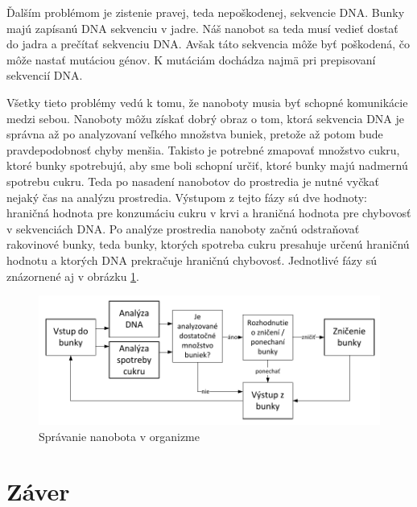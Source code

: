 \documentclass[10pt,twoside,slovak,a4paper]{article}
\begin{document}
Ďalším problémom je zistenie pravej, teda nepoškodenej, sekvencie DNA. Bunky majú zapísanú DNA sekvenciu v jadre. Náš nanobot sa teda musí vedieť dostať do jadra a prečítať sekvenciu DNA. Avšak táto sekvencia môže byť poškodená, čo môže nastať mutáciou génov. K mutáciám dochádza najmä pri prepisovaní sekvencií DNA.
\cite{Wikipedia-glukoza, Wikipedia-jadro, Wikipedia-mutations}

Všetky tieto problémy vedú k tomu, že nanoboty musia byť schopné komunikácie medzi sebou. Nanoboty môžu získať dobrý obraz o tom, ktorá sekvencia DNA je správna až po analyzovaní veľkého množstva buniek, pretože až potom bude pravdepodobnosť chyby menšia. Takisto je potrebné zmapovať množstvo cukru, ktoré bunky spotrebujú, aby sme boli schopní určiť, ktoré bunky majú nadmernú spotrebu cukru. Teda po nasadení nanobotov do prostredia je nutné vyčkať nejaký čas na analýzu prostredia. Výstupom z tejto fázy sú dve hodnoty: hraničná hodnota pre konzumáciu cukru v krvi a hraničná hodnota pre chybovosť v sekvenciách DNA. Po analýze prostredia nanoboty začnú odstraňovať rakovinové bunky, teda bunky, ktorých spotreba cukru presahuje určenú hraničnú hodnotu a ktorých DNA prekračuje hraničnú chybovosť. Jednotlivé fázy sú znázornené aj v obrázku \ref{f:spravanie}.

\begin{figure}[tbh]
\label{f:spravanie}
\includegraphics[scale=0.9]{spravanie.pdf}
\caption{Správanie nanobota v organizme}
\end{figure}

\section{Záver}

\listoffigures


\end{document}
